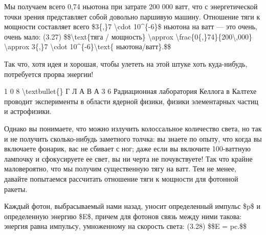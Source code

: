 \documentclass[10pt,oneside]{article}
\newcommand{\TipsSubsection}[1]{\par\vspace{6bp}{\normalsize\bfseries #1\par}\vspace{2bp}}
\begin{document}
Мы получаем всего 0,74 ньютона при затрате 200 000 ватт, что с энергетической точки зрения представляет собой довольно паршивую машину. Отношение тяги к мощности составляет всего \$3\{,\}7 \textbackslash{}cdot 10\textasciicircum{}\{-6\}\$ ньютона на ватт --- это очень, очень мало: (3.27) \$\$\textbackslash{}text\{тяга / мощность\} \textbackslash{}approx \textbackslash{}frac\{0\{,\}74\}\{200\textbackslash{},000\} \textbackslash{}approx 3\{,\}7 \textbackslash{}cdot 10\textasciicircum{}\{-6\}\textbackslash{}text\{ ньютона/ватт\}.\$\$\par

Так что, хотя идея и хорошая, чтобы улететь на этой штуке хоть куда-нибудь, потребуется прорва энергии!\par

1 0 8 \textbackslash{}textbullet\{\} Г Л А В А  3 6 Радиационная лаборатория Келлога в Калтехе проводит эксперименты в области ядерной физики, физики элементарных частиц и астрофизики.\par

\TipsSubsection{3-8 Электростатический отклонитель протонного пучка Следующая задача, которую я придумал, чтобы показать, на что вы способны, такова. В Лаборатории Келлога6 у нас есть генератор Ван де Граафа, ускоряющий протоны до напряжения 2 миллиона вольт. Разность потенциалов создается электростатически с помощью движущейся ленты. Протоны проходят через этот потенциал, приобретают большую энергию и вылетают в виде пучка.}

\TipsSubsection{3-7 Фотонные ракеты Была предложена и другая ракета, основанная на том, что чем быстрее выбрасывается выхлоп, тем лучше. А почему бы не выбрасывать фотоны --- ведь это самое быстрое, что есть на свете, --- просто светить назад! Вы забираетесь в хвост ракеты, включаете карманный фонарик --- и получаете толчок!}

Однако вы понимаете, что можно излучить колоссальное количество света, но так и не получить сколько-нибудь заметного толчка: вы знаете по опыту, что когда вы включаете фонарик, вас не сбивает с ног; даже если вы включите 100-ваттную лампочку и сфокусируете ее свет, вы ни черта не почувствуете! Так что крайне маловероятно, что мы получим существенную тягу на ватт. Тем не менее, давайте попытаемся рассчитать отношение тяги к мощности для фотонной ракеты.\par

Каждый фотон, выбрасываемый нами назад, уносит определенный импульс \$p\$ и определенную энергию \$E\$, причем для фотонов связь между ними такова: энергия равна импульсу, умноженному на скорость света: (3.28) \$\$E = pc.\$\$\par
\end{document}
